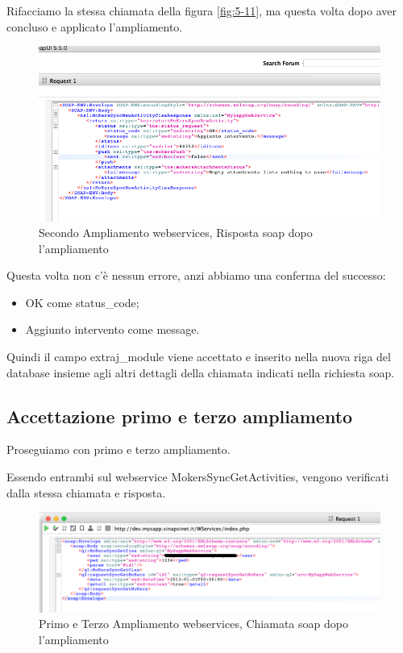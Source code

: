 	Rifacciamo la stessa chiamata della figura \ref{fig:5-11}, ma questa volta dopo aver concluso e applicato l'ampliamento.


\begin{figure}[!h] 
	\centering
	\includegraphics[scale = 0.5]{immagini/webservices/ampliamenti/accettazione/2ampl_soap_risposta_postmodifica.png}
	\caption{Secondo Ampliamento webservices, Risposta \gls{soap} dopo l'ampliamento}
\end{figure}

	Questa volta non c'è nessun errore, anzi abbiamo una conferma del successo:
	\begin{itemize}
		\item OK come status\_code;
		\item Aggiunto intervento come message.
	\end{itemize}
	
	Quindi il campo extraj\_module viene accettato e inserito nella nuova riga del database insieme agli altri dettagli della chiamata indicati nella richiesta \gls{soap}.

\newpage

\subsection{Accettazione primo e terzo ampliamento}

	Proseguiamo con primo e terzo ampliamento.
	
	Essendo entrambi sul webservice MokersSyncGetActivities, vengono verificati dalla stessa chiamata e risposta.

\begin{figure}[!h] 
	\centering
	\includegraphics[scale = 0.5]{immagini/webservices/ampliamenti/accettazione/3ampl_soap_chiamata.png}
	\caption{Primo e Terzo Ampliamento webservices, Chiamata \gls{soap} dopo l'ampliamento}
	\label{fig:5-15}
\end{figure}


